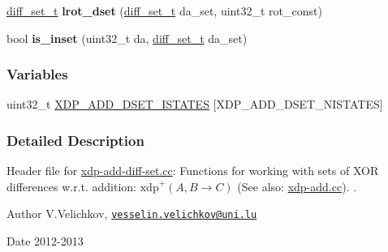 \begin{DoxyCompactItemize}
\item 
\hypertarget{xdp-add-diff-set_8hh_af6e36c6f73b6132afd4a32a20b0404dd}{\hyperlink{structdiff__set__t}{diff\-\_\-set\-\_\-t} {\bfseries lrot\-\_\-dset} (\hyperlink{structdiff__set__t}{diff\-\_\-set\-\_\-t} da\-\_\-set, uint32\-\_\-t rot\-\_\-const)}\label{xdp-add-diff-set_8hh_af6e36c6f73b6132afd4a32a20b0404dd}

\item 
\hypertarget{xdp-add-diff-set_8hh_abb472748ae675f163774759d8fb53909}{bool {\bfseries is\-\_\-inset} (uint32\-\_\-t da, \hyperlink{structdiff__set__t}{diff\-\_\-set\-\_\-t} da\-\_\-set)}\label{xdp-add-diff-set_8hh_abb472748ae675f163774759d8fb53909}

\end{DoxyCompactItemize}
\subsubsection*{\-Variables}
\begin{DoxyCompactItemize}
\item 
uint32\-\_\-t \hyperlink{xdp-add-diff-set_8hh_ad4c6b8f71989229250c5721d60be9868}{\-X\-D\-P\-\_\-\-A\-D\-D\-\_\-\-D\-S\-E\-T\-\_\-\-I\-S\-T\-A\-T\-E\-S} \mbox{[}\-X\-D\-P\-\_\-\-A\-D\-D\-\_\-\-D\-S\-E\-T\-\_\-\-N\-I\-S\-T\-A\-T\-E\-S\mbox{]}
\end{DoxyCompactItemize}


\subsubsection{\-Detailed \-Description}
\-Header file for \hyperlink{xdp-add-diff-set_8cc}{xdp-\/add-\/diff-\/set.\-cc}\-: \-Functions for working with sets of \-X\-O\-R differences w.\-r.\-t. addition\-: $\mathrm{xdp}^{+}(A,B \rightarrow C)$ (\-See also\-: \hyperlink{xdp-add_8cc}{xdp-\/add.\-cc}). . \begin{DoxyAuthor}{\-Author}
\-V.\-Velichkov, \href{mailto:vesselin.velichkov@uni.lu}{\tt vesselin.\-velichkov@uni.\-lu} 
\end{DoxyAuthor}
\begin{DoxyDate}{\-Date}
2012-\/2013 
\end{DoxyDate}


